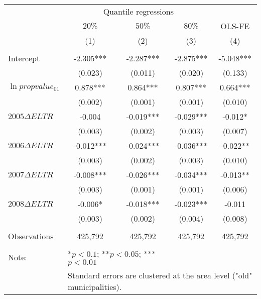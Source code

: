 \begin{table}[H]
  \centering
  \begin{tabular}{@{}lcccc@{}}
  \toprule
                         & \multicolumn{3}{c}{Quantile regressions} &           \\ \cmidrule(lr){2-4}
                         & $20\%$       & $50\%$      & $80\%$      & OLS-FE    \\
                         & (1)          & (2)         & (3)         & (4)       \\ \midrule
  \multicolumn{5}{l}{}                                                          \\
  Intercept              & -2.305***    & -2.287***   & -2.875***   & -5.048*** \\
                         & (0.023)      & (0.011)     & (0.020)     & (0.133)   \\
  $\ln{propvalue_{01}}$          & 0.878***     & 0.864***    & 0.807***    & 0.664***  \\
                         & (0.002)      & (0.001)     & (0.001)     & (0.010)   \\
  $2005\Delta ELTR$ & -0.004       & -0.019***   & -0.029***   & -0.012*   \\
                         & (0.003)      & (0.002)     & (0.003)     & (0.007)   \\
  $2006\Delta ELTR$ & -0.012***    & -0.024***   & -0.036***   & -0.022**  \\
                         & (0.003)      & (0.002)     & (0.003)     & (0.010)   \\
  $2007\Delta ELTR$ & -0.008***    & -0.026***   & -0.034***   & -0.013**  \\
                         & (0.003)      & (0.001)     & (0.001)     & (0.006)   \\
  $2008\Delta ELTR$ & -0.006*      & -0.018***   & -0.023***   & -0.011    \\
                         & (0.003)      & (0.002)     & (0.004)     & (0.008)   \\ \midrule
  \multicolumn{5}{l}{}                                                          \\
  Observations           & 425,792      & 425,792     & 425,792     & 425,792   \\
  \multicolumn{5}{l}{}                                                          \\ \midrule
  Note:                  & \multicolumn{2}{l}{*$p<0.1$; **$p<0.05$; ***$p<0.01$}      \\
   & \multicolumn{4}{l}{Standard errors are clustered at the area level ("old" municipalities).}
  \end{tabular}
  \end{table}